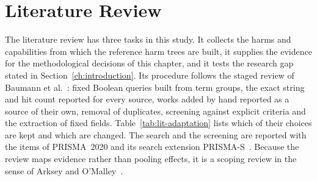 \section{Literature Review}
\label{sec:lit-review}
The literature review has three tasks in this study. It collects the harms and
capabilities from which the reference harm trees are built, it supplies the
evidence for the methodological decisions of this chapter, and it tests the
research gap stated in Section~\ref{ch:introduction}. Its procedure follows the
staged review of Baumann et al.~\parencite[App.~A, pp.~56--57]{baumann2025llm}:
fixed Boolean queries built from term groups, the exact string and hit count
reported for every source, works added by hand reported as a source of their
own, removal of duplicates, screening against explicit criteria and the
extraction of fixed fields. Table~\ref{tab:lit-adaptation} lists which of their
choices are kept and which are changed. The search and the screening are reported
with the items of PRISMA~2020 and its search extension
PRISMA-S~\parencite{page2021prisma,rethlefsen2021prisma}. Because the review
maps evidence rather than pooling effects, it is a scoping
review in the sense of Arksey and O'Malley~\parencite{arksey2005scoping}.

